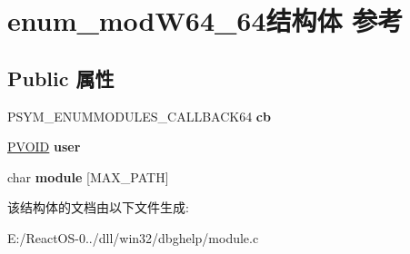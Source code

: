 \hypertarget{structenum__mod_w64__64}{}\section{enum\+\_\+mod\+W64\+\_\+64结构体 参考}
\label{structenum__mod_w64__64}
\subsection*{Public 属性}
\begin{DoxyCompactItemize}
\item 
\mbox{\label{structenum__mod_w64__64_a71d5a0da96e5e7e0201039ec952e73fa}} 
P\+S\+Y\+M\+\_\+\+E\+N\+U\+M\+M\+O\+D\+U\+L\+E\+S\+\_\+\+C\+A\+L\+L\+B\+A\+C\+K64 {\bfseries cb}
\item 
\mbox{\label{structenum__mod_w64__64_a6d955cfb30326478fc4a9d278d3bb77b}} 
\hyperlink{interfacevoid}{P\+V\+O\+ID} {\bfseries user}
\item 
\mbox{\label{structenum__mod_w64__64_a711437e8fa07969b24b2d11328d1b953}} 
char {\bfseries module} \mbox{[}M\+A\+X\+\_\+\+P\+A\+TH\mbox{]}
\end{DoxyCompactItemize}


该结构体的文档由以下文件生成\+:\begin{DoxyCompactItemize}
\item 
E\+:/\+React\+O\+S-\/0../dll/win32/dbghelp/module.\+c\end{DoxyCompactItemize}
